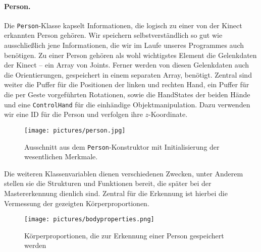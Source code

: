 	\paragraph{Person.} Die \texttt{Person}-Klasse kapselt Informationen, die logisch zu einer von der Kinect erkannten Person gehören. Wir speichern selbstverständlich so gut wie ausschließlich jene Informationen, die wir im Laufe unseres Programmes auch benötigen. Zu einer Person gehören als wohl wichtigstes Element die Gelenkdaten der Kinect -- ein Array von Joints. Ferner werden von diesen Gelenkdaten auch die Orientierungen, gespeichert in einem separaten Array, benötigt. Zentral sind weiter die Puffer für die Positionen der linken und rechten Hand, ein Puffer für die per Geste vorgeführten Rotationen, sowie die HandStates der beiden Hände und eine \glqq \texttt{ControlHand}\grqq{} für die einhändige Objektmanipulation. Dazu verwenden wir eine ID für die Person und verfolgen ihre $z$-Koordinate. 
	\begin{figure}[h]
	\centering
	\texttt{[image: pictures/person.jpg]}
	\caption{Ausschnitt aus dem \texttt{Person}-Konstruktor mit Initialisierung der wesentlichen Merkmale.}
	\end{figure}\par\medskip
	
	Die weiteren Klassenvariablen dienen verschiedenen Zwecken, unter Anderem stellen sie die Strukturen und Funktionen bereit, die später bei der Mastererkennung dienlich sind. Zentral für die Erkennung ist hierbei die Vermessung der gezeigten Körperproportionen.
	\begin{figure}[h]
	\centering
	\texttt{[image: pictures/bodyproperties.png]}
	\caption{Körperproportionen, die zur Erkennung einer Person gespeichert werden}
	\end{figure}\par\medskip
	
